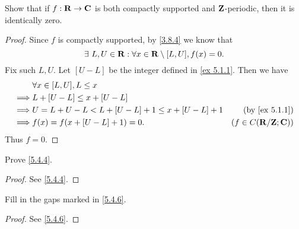 \exercisesection

\begin{exercise}\label{ex 5.4.1}
  Show that if \(f : \mathbf{R} \to \mathbf{C}\) is both compactly supported and \(\mathbf{Z}\)-periodic, then it is identically zero.
\end{exercise}

\begin{proof}
  Since \(f\) is compactly supported, by \cref{3.8.4} we know that
  \[
    \exists\ L, U \in \mathbf{R} : \forall x \in \mathbf{R} \setminus [L, U], f(x) = 0.
  \]
  Fix such \(L, U\).
  Let \([U - L]\) be the integer defined in \cref{ex 5.1.1}.
  Then we have
  \begin{align*}
             & \forall x \in [L, U], L \leq x                                                     \\
    \implies & L + [U - L] \leq x + [U - L]                                                       \\
    \implies & U = L + U - L < L + [U - L] + 1 \leq x + [U - L] + 1 & \text{(by \cref{ex 5.1.1})} \\
    \implies & f(x) = f(x + [U - L] + 1) = 0.                       & (f \in C(\R / \Z ; \C))
  \end{align*}
  Thus \(f = 0\).
\end{proof}

\begin{exercise}\label{ex 5.4.2}
  Prove \cref{5.4.4}.
\end{exercise}

\begin{proof}
  See \cref{5.4.4}.
\end{proof}

\begin{exercise}\label{ex 5.4.3}
  Fill in the gaps marked in \cref{5.4.6}.
\end{exercise}

\begin{proof}
  See \cref{5.4.6}.
\end{proof}
